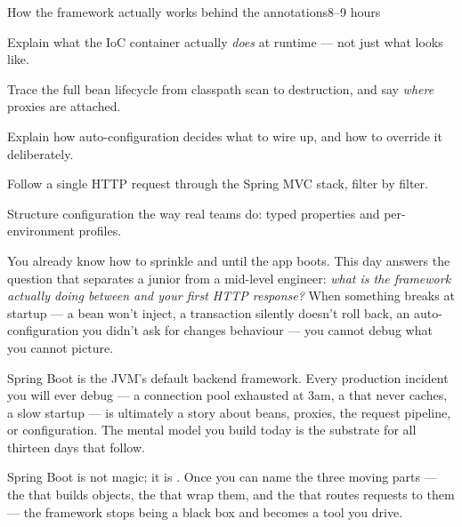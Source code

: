 %
{How the framework actually works behind the annotations}{8--9 hours}

\begin{objectives}
\begin{wbitem}
  \item Explain what the IoC container actually \emph{does} at runtime — not just what  looks like.
  \item Trace the full bean lifecycle from classpath scan to destruction, and say \emph{where} proxies are attached.
  \item Explain how auto-configuration decides what to wire up, and how to override it deliberately.
  \item Follow a single HTTP request through the Spring MVC stack, filter by filter.
  \item Structure configuration the way real teams do: typed properties and per-environment profiles.
\end{wbitem}
\end{objectives}


 You already know how to sprinkle  and  until the app boots. This day answers the question that separates a junior from a mid-level engineer: \emph{what is the framework actually doing between  and your first HTTP response?} When something breaks at startup — a bean won't inject, a transaction silently doesn't roll back, an auto-configuration you didn't ask for changes behaviour — you cannot debug what you cannot picture.

 Spring Boot is the JVM's default backend framework. Every production incident you will ever debug — a connection pool exhausted at 3am, a  that never caches, a slow startup — is ultimately a story about beans, proxies, the request pipeline, or configuration. The mental model you build today is the substrate for all thirteen days that follow.

\begin{keyidea}
Spring Boot is not magic; it is . Once you can name the three moving parts — the  that builds objects, the  that wrap them, and the  that routes requests to them — the framework stops being a black box and becomes a tool you drive.
\end{keyidea}

